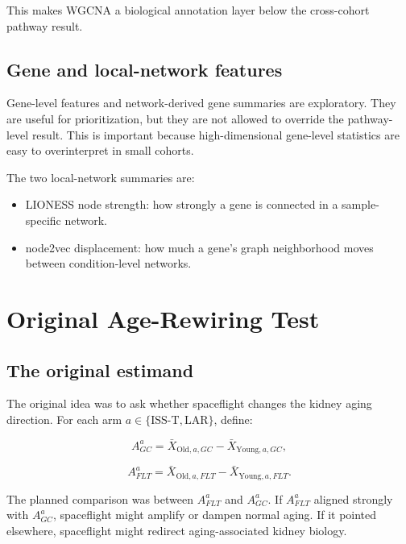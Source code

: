 \documentclass[11pt]{article}
\begin{document}
This makes WGCNA a biological annotation layer below the cross-cohort pathway result.

\subsection{Gene and local-network features}

Gene-level features and network-derived gene summaries are exploratory. They are useful for prioritization, but they are not allowed to override the pathway-level result. This is important because high-dimensional gene-level statistics are easy to overinterpret in small cohorts.

The two local-network summaries are:

\begin{itemize}
  \item LIONESS node strength: how strongly a gene is connected in a sample-specific network.
  \item node2vec displacement: how much a gene's graph neighborhood moves between condition-level networks.
\end{itemize}

\section{Original Age-Rewiring Test}

\subsection{The original estimand}

The original idea was to ask whether spaceflight changes the kidney aging direction. For each arm $a\in\{\mathrm{ISS\mbox{-}T},\mathrm{LAR}\}$, define:

\begin{equation}
A^a_{GC}=\bar{X}_{\mathrm{Old},a,GC}-\bar{X}_{\mathrm{Young},a,GC},
\end{equation}

\begin{equation}
A^a_{FLT}=\bar{X}_{\mathrm{Old},a,FLT}-\bar{X}_{\mathrm{Young},a,FLT}.
\end{equation}

The planned comparison was between $A^a_{FLT}$ and $A^a_{GC}$. If $A^a_{FLT}$ aligned strongly with $A^a_{GC}$, spaceflight might amplify or dampen normal aging. If it pointed elsewhere, spaceflight might redirect aging-associated kidney biology.
\end{document}
